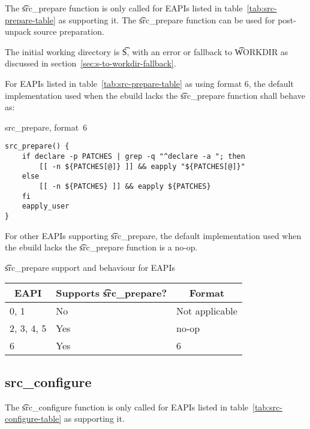  The \t{src\_prepare} function is only called for EAPIs listed in
table~\ref{tab:src-prepare-table} as supporting it. The \t{src\_prepare} function can be used for
post-unpack source preparation.

The initial working directory is \t{S}, with an error or fallback to \t{WORKDIR} as discussed in
section~\ref{sec:s-to-workdir-fallback}.

 For EAPIs listed in table~\ref{tab:src-prepare-table} as using format
6, the default implementation used when the ebuild lacks the \t{src\_prepare} function shall behave
as:

\begin{listing}[H]
\caption{src\_prepare, format~6} \label{lst:src-prepare-6}
\begin{verbatim}
src_prepare() {
    if declare -p PATCHES | grep -q "^declare -a "; then
        [[ -n ${PATCHES[@]} ]] && eapply "${PATCHES[@]}"
    else
        [[ -n ${PATCHES} ]] && eapply ${PATCHES}
    fi
    eapply_user
}
\end{verbatim}
\end{listing}

For other EAPIs supporting \t{src\_prepare}, the default implementation used when the ebuild lacks
the \t{src\_prepare} function is a no-op.

\begin{centertable}{\t{src\_prepare} support and behaviour for EAPIs}
    \label{tab:src-prepare-table}
    \begin{tabular}{lll}
      \toprule
      \multicolumn{1}{c}{\textbf{EAPI}} &
      \multicolumn{1}{c}{\textbf{Supports \t{src\_prepare}?}} &
      \multicolumn{1}{c}{\textbf{Format}} \\
      \midrule
      0, 1              & No  & Not applicable \\
      2, 3, 4, 5        & Yes & no-op          \\
      6                 & Yes & 6              \\
      \bottomrule
    \end{tabular}
\end{centertable}

\subsection{src\_configure}
\label{sec:src-configure-function}

 The \t{src\_configure} function is only called for EAPIs listed in
table~\ref{tab:src-configure-table} as supporting it.

